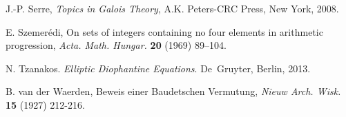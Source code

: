 \documentclass{article}
\theoremstyle{plain}
\theoremstyle{definition}
\begin{document}
\begin{thebibliography}{26}
J.-P. Serre,
\textit{Topics in Galois Theory},
A.K. Peters-CRC Press, New York, 2008.




E. Szemer\'edi,
On sets of integers containing no four elements in arithmetic
progression,
\textit{Acta. Math. Hungar.} \textbf{20} (1969) 89--104.

N. Tzanakos.
\textit{Elliptic Diophantine Equations}.
De~Gruyter, Berlin, 2013.

B. van der Waerden,
Beweis einer Baudetschen Vermutung,
\textit{Nieuw Arch. Wisk.} \textbf{15} (1927) 212-216.









\end{thebibliography}

 
\end{document}
